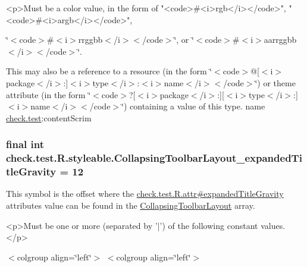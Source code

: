 \begin{DoxyVerb}      <p>Must be a color value, in the form of "<code>#<i>rgb</i></code>", "<code>#<i>argb</i></code>",
\end{DoxyVerb}
 \char`\"{}$<$code$>$\#$<$i$>$rrggbb$<$/i$>$$<$/code$>$\char`\"{}, or \char`\"{}$<$code$>$\#$<$i$>$aarrggbb$<$/i$>$$<$/code$>$\char`\"{}. 

This may also be a reference to a resource (in the form \char`\"{}$<$code$>$@\mbox{[}$<$i$>$package$<$/i$>$\+:\mbox{]}$<$i$>$type$<$/i$>$\+:$<$i$>$name$<$/i$>$$<$/code$>$\char`\"{}) or theme attribute (in the form \char`\"{}$<$code$>$?\mbox{[}$<$i$>$package$<$/i$>$\+:\mbox{]}\mbox{[}$<$i$>$type$<$/i$>$\+:\mbox{]}$<$i$>$name$<$/i$>$$<$/code$>$\char`\"{}) containing a value of this type.  name \hyperlink{namespacecheck_1_1test}{check.\+test}\+:content\+Scrim \hypertarget{classcheck_1_1test_1_1_r_1_1styleable_a111ed46d59211ccdd56c892aa2be9eb6}{}
\subsubsection[{Collapsing\+Toolbar\+Layout\+\_\+expanded\+Title\+Gravity}]{\setlength{\rightskip}{0pt plus 5cm}final int check.\+test.\+R.\+styleable.\+Collapsing\+Toolbar\+Layout\+\_\+expanded\+Title\+Gravity = 12\hspace{0.3cm}{\ttfamily [static]}}\label{classcheck_1_1test_1_1_r_1_1styleable_a111ed46d59211ccdd56c892aa2be9eb6}
This symbol is the offset where the \hyperlink{classcheck_1_1test_1_1_r_1_1attr_ae2a60d204e002a5afb562ba3ba1fcd22}{check.\+test.\+R.\+attr\#expanded\+Title\+Gravity} attribute\textquotesingle{}s value can be found in the \hyperlink{classcheck_1_1test_1_1_r_1_1styleable_a0c512120c75d0ddac20063034a72db17}{Collapsing\+Toolbar\+Layout} array.

\begin{DoxyVerb}      <p>Must be one or more (separated by '|') of the following constant values.</p>
\end{DoxyVerb}
 \begin{TabularC}{0}
\hline
\end{TabularC}
$<$colgroup align=\char`\"{}left\char`\"{}$>$ $<$colgroup align=\char`\"{}left\char`\"{}$>$ 

